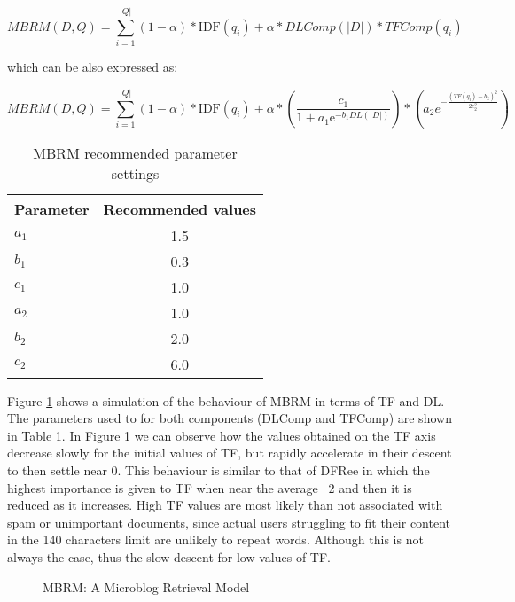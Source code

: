 \begin{equation}
MBRM(D,Q) = \sum_{i=1}^{|Q|} (1-\alpha)*\text{IDF}(q_i) + \alpha * DLComp(|D|) * TFComp(q_i)
\end{equation}

which can be also expressed as:

\begin{equation}
MBRM(D,Q) = \sum_{i=1}^{|Q|} (1-\alpha)*\text{IDF}(q_i) + \alpha * \left({\frac  {c_1}{1+{a_1\mathrm e}^{{-b_1DL(|D|)}}}} \right) * \left(a_2e^{-{\frac {(TF(q_i)-b_2)^{2}}{2c_2^{2}}}}\right) 
\end{equation}

\begin{table}[]
	\caption{MBRM recommended parameter settings} 
	\centering
	\begin{tabular}{l|c} 	
		\hline
		\textbf{Parameter} & \textbf{Recommended values} \\
		\hline
		\centering					 
		$a_1$ & 1.5 \\
		$b_1$ & 0.3 \\
		$c_1$ & 1.0 \\
		\hline
		$a_2$ & 1.0 \\
		$b_2$ & 2.0 \\
		$c_2$ & 6.0 \\
		\hline
	\end{tabular}
	\label{recommended settings}
\end{table}

Figure \ref{microblogRM} shows a simulation of the behaviour of MBRM in terms of TF and DL. The parameters used to for both components (DLComp and TFComp) are shown in Table \ref{recommended settings}. In Figure \ref{microblogRM} we can observe how the values obtained on the TF axis decrease slowly for the initial values of TF, but rapidly accelerate in their descent to then settle near 0. This behaviour is similar to that of DFRee in which the highest importance is given to TF when near the average ~2 and then it is reduced as it increases. High TF values are most likely than not associated with spam or unimportant documents, since actual users struggling to fit their content in the 140 characters limit are unlikely to repeat words. Although this is not always the case, thus the slow descent for low values of TF.


\begin{figure}
	\centering
	\caption{MBRM: A Microblog Retrieval Model}
	
	\label{microblogRM}
\end{figure} 

